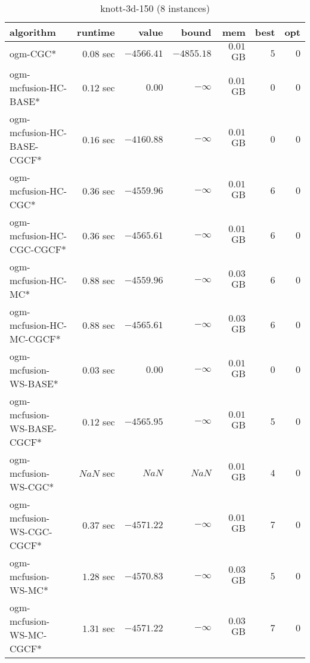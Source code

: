 \begin{table}[H]
\scriptsize
\centering
\caption{knott-3d-150 (8 instances)}
\label{tab:smalltable-knott-3d-150}
\begin{tabular}{lrrrrrr}
\toprule
           algorithm &       runtime     &         value &         bound &           mem &     best &      opt   \\ \midrule 
            ogm-CGC* & $         0.08$ sec & $     -4566.41$ & $     -4855.18$ & $         0.01$ GB & $       5$ & $       0$ \\ 
ogm-mcfusion-HC-BASE* & $         0.12$ sec & $         0.00$ & $-\infty$ & $         0.01$ GB & $       0$ & $       0$ \\ 
ogm-mcfusion-HC-BASE-CGCF* & $         0.16$ sec & $     -4160.88$ & $-\infty$ & $         0.01$ GB & $       0$ & $       0$ \\ 
ogm-mcfusion-HC-CGC* & $         0.36$ sec & $     -4559.96$ & $-\infty$ & $         0.01$ GB & $       6$ & $       0$ \\ 
ogm-mcfusion-HC-CGC-CGCF* & $         0.36$ sec & $     -4565.61$ & $-\infty$ & $         0.01$ GB & $       6$ & $       0$ \\ 
 ogm-mcfusion-HC-MC* & $         0.88$ sec & $     -4559.96$ & $-\infty$ & $         0.03$ GB & $       6$ & $       0$ \\ 
ogm-mcfusion-HC-MC-CGCF* & $         0.88$ sec & $     -4565.61$ & $-\infty$ & $         0.03$ GB & $       6$ & $       0$ \\ 
ogm-mcfusion-WS-BASE* & $         0.03$ sec & $         0.00$ & $-\infty$ & $         0.01$ GB & $       0$ & $       0$ \\ 
ogm-mcfusion-WS-BASE-CGCF* & $         0.12$ sec & $     -4565.95$ & $-\infty$ & $         0.01$ GB & $       5$ & $       0$ \\ 
ogm-mcfusion-WS-CGC* & $          NaN$ sec & $          NaN$ & $          NaN$ & $         0.01$ GB & $       4$ & $       0$ \\ 
ogm-mcfusion-WS-CGC-CGCF* & $         0.37$ sec & $     -4571.22$ & $-\infty$ & $         0.01$ GB & $       7$ & $       0$ \\ 
 ogm-mcfusion-WS-MC* & $         1.28$ sec & $     -4570.83$ & $-\infty$ & $         0.03$ GB & $       5$ & $       0$ \\ 
ogm-mcfusion-WS-MC-CGCF* & $         1.31$ sec & $     -4571.22$ & $-\infty$ & $         0.03$ GB & $       7$ & $       0$ \\ 
\bottomrule
\end{tabular}
\end{table}